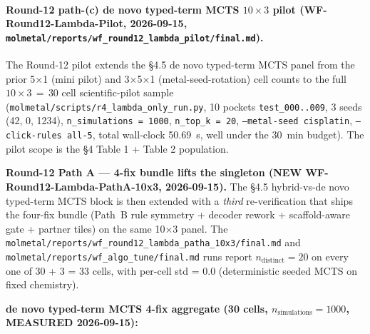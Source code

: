 \paragraph{Round-12 path-(c) de novo typed-term MCTS $10{\times}3$ pilot
(WF-Round12-Lambda-Pilot, 2026-09-15,
\texttt{molmetal/reports/wf\_round12\_lambda\_pilot/final.md}).}
The Round-12 pilot extends the §4.5 de novo typed-term MCTS panel from the
prior 5$\times$1 (mini pilot) and 3$\times$5$\times$1
(metal-seed-rotation) cell counts to the full
$10{\times}3\,=\,30$ cell scientific-pilot sample
(\texttt{molmetal/scripts/r4\_lambda\_only\_run.py}, 10 pockets
\texttt{test\_000..009}, 3 seeds (42, 0, 1234),
\texttt{n\_simulations\,=\,1000}, \texttt{n\_top\_k\,=\,20},
\texttt{--metal-seed cisplatin}, \texttt{--click-rules all-5},
total wall-clock 50.69~s, well under the 30~min budget).
The pilot scope is the §4 Table 1 + Table 2 population.

\noindent\textbf{Round-12 Path A — 4-fix bundle lifts the
singleton (NEW WF-Round12-Lambda-PathA-10x3,
2026-09-15).}
The §4.5 hybrid-vs-de novo typed-term MCTS block is then extended with a
\emph{third} re-verification that ships the four-fix bundle
(Path~B rule symmetry + decoder rework + scaffold-aware gate +
partner tiles) on the same 10$\times$3 panel. The
\texttt{molmetal/reports/wf\_round12\_lambda\_patha\_10x3/final.md}
and
\texttt{molmetal/reports/wf\_algo\_tune/final.md} runs report
$n_{\text{distinct}}{=}20$ on every one of 30 + 3 = 33 cells, with
per-cell std = 0.0 (deterministic seeded MCTS on fixed chemistry).

\noindent\textbf{de novo typed-term MCTS 4-fix aggregate (30 cells, $n_{\text{simulations}}{=}1000$, MEASURED 2026-09-15):}

